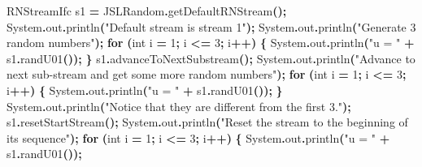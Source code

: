 \documentclass[
]{book}
\newenvironment{Shaded}{\begin{snugshade}}{\end{snugshade}}
\newcommand{\BuiltInTok}[1]{#1}
\newcommand{\ControlFlowTok}[1]{\textcolor[rgb]{0.13,0.29,0.53}{\textbf{#1}}}
\newcommand{\DataTypeTok}[1]{\textcolor[rgb]{0.13,0.29,0.53}{#1}}
\newcommand{\DecValTok}[1]{\textcolor[rgb]{0.00,0.00,0.81}{#1}}
\newcommand{\FunctionTok}[1]{\textcolor[rgb]{0.00,0.00,0.00}{#1}}
\newcommand{\NormalTok}[1]{#1}
\newcommand{\OperatorTok}[1]{\textcolor[rgb]{0.81,0.36,0.00}{\textbf{#1}}}
\newcommand{\StringTok}[1]{\textcolor[rgb]{0.31,0.60,0.02}{#1}}
\theoremstyle{definition}
\theoremstyle{definition}
\theoremstyle{definition}
\theoremstyle{definition}
\theoremstyle{remark}
\begin{document}
\begin{Shaded}
\begin{Highlighting}[]
\NormalTok{RNStreamIfc s1 }\OperatorTok{=}\NormalTok{ JSLRandom}\OperatorTok{.}\FunctionTok{getDefaultRNStream}\OperatorTok{();}
\BuiltInTok{System}\OperatorTok{.}\FunctionTok{out}\OperatorTok{.}\FunctionTok{println}\OperatorTok{(}\StringTok{"Default stream is stream 1"}\OperatorTok{);}
\BuiltInTok{System}\OperatorTok{.}\FunctionTok{out}\OperatorTok{.}\FunctionTok{println}\OperatorTok{(}\StringTok{"Generate 3 random numbers"}\OperatorTok{);}
\ControlFlowTok{for} \OperatorTok{(}\DataTypeTok{int}\NormalTok{ i }\OperatorTok{=} \DecValTok{1}\OperatorTok{;}\NormalTok{ i }\OperatorTok{\textless{}=} \DecValTok{3}\OperatorTok{;}\NormalTok{ i}\OperatorTok{++)} \OperatorTok{\{}
    \BuiltInTok{System}\OperatorTok{.}\FunctionTok{out}\OperatorTok{.}\FunctionTok{println}\OperatorTok{(}\StringTok{"u = "} \OperatorTok{+}\NormalTok{ s1}\OperatorTok{.}\FunctionTok{randU01}\OperatorTok{());}
\OperatorTok{\}}
\NormalTok{s1}\OperatorTok{.}\FunctionTok{advanceToNextSubstream}\OperatorTok{();}
\BuiltInTok{System}\OperatorTok{.}\FunctionTok{out}\OperatorTok{.}\FunctionTok{println}\OperatorTok{(}\StringTok{"Advance to next sub{-}stream and get some more random numbers"}\OperatorTok{);}
\ControlFlowTok{for} \OperatorTok{(}\DataTypeTok{int}\NormalTok{ i }\OperatorTok{=} \DecValTok{1}\OperatorTok{;}\NormalTok{ i }\OperatorTok{\textless{}=} \DecValTok{3}\OperatorTok{;}\NormalTok{ i}\OperatorTok{++)} \OperatorTok{\{}
    \BuiltInTok{System}\OperatorTok{.}\FunctionTok{out}\OperatorTok{.}\FunctionTok{println}\OperatorTok{(}\StringTok{"u = "} \OperatorTok{+}\NormalTok{ s1}\OperatorTok{.}\FunctionTok{randU01}\OperatorTok{());}
\OperatorTok{\}}
\BuiltInTok{System}\OperatorTok{.}\FunctionTok{out}\OperatorTok{.}\FunctionTok{println}\OperatorTok{(}\StringTok{"Notice that they are different from the first 3."}\OperatorTok{);}
\NormalTok{s1}\OperatorTok{.}\FunctionTok{resetStartStream}\OperatorTok{();}
\BuiltInTok{System}\OperatorTok{.}\FunctionTok{out}\OperatorTok{.}\FunctionTok{println}\OperatorTok{(}\StringTok{"Reset the stream to the beginning of its sequence"}\OperatorTok{);}
\ControlFlowTok{for} \OperatorTok{(}\DataTypeTok{int}\NormalTok{ i }\OperatorTok{=} \DecValTok{1}\OperatorTok{;}\NormalTok{ i }\OperatorTok{\textless{}=} \DecValTok{3}\OperatorTok{;}\NormalTok{ i}\OperatorTok{++)} \OperatorTok{\{}
    \BuiltInTok{System}\OperatorTok{.}\FunctionTok{out}\OperatorTok{.}\FunctionTok{println}\OperatorTok{(}\StringTok{"u = "} \OperatorTok{+}\NormalTok{ s1}\OperatorTok{.}\FunctionTok{randU01}\OperatorTok{());}

\end{Highlighting}
\end{Shaded}
\end{document}
